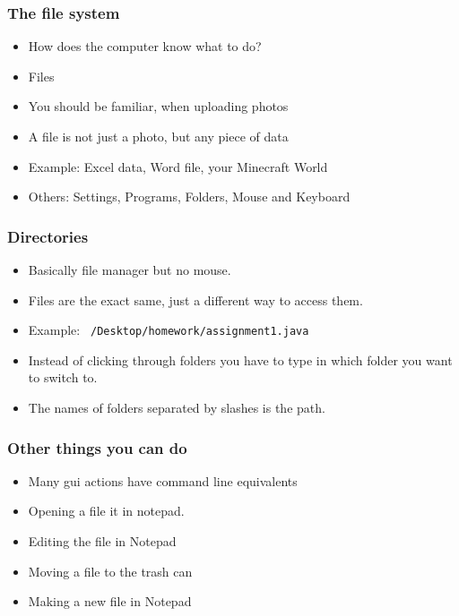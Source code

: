 \documentclass[aspectratio=169,hyperref={unicode}]{beamer}
\begin{document}
\begin{frame}[fragile]
\frametitle{The file system}
\begin{itemize}
  \item How does the computer know what to do?
        \item Files
        \item You should be familiar, when uploading photos
        \item A file is not just a photo, but any piece of data
        \item Example: Excel data, Word file, your Minecraft World
        \item Others: Settings, Programs, Folders, Mouse and Keyboard
\end{itemize}
\end{frame}

\begin{frame}[fragile]
\frametitle{Directories}
\begin{itemize}
\item Basically file manager but no mouse.
        \item Files are the exact same, just a different way to access them.
\item Example: \texttt{~/Desktop/homework/assignment1.java}

        \item Instead of clicking through folders you have to type in which folder you want to switch to.
        \item The names of folders separated by slashes is the path.
\end{itemize}
\end{frame}


\begin{frame}[fragile]
\frametitle{Other things you can do}
\begin{itemize}
        \item Many gui actions have command line equivalents
\item Opening a file it in notepad.
  \item Editing the file in Notepad
        \item Moving a file to the trash can
        \item Making a new file in Notepad
\end{itemize}
\end{frame}
\end{document}
